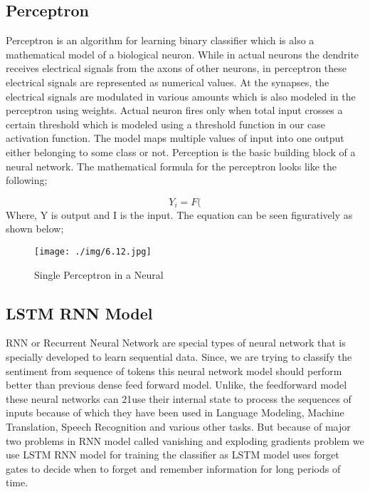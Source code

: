         \subsection{Perceptron}
Perceptron is an algorithm for learning binary classifier which is also a mathematical
model of a biological neuron. While in actual neurons the dendrite receives electrical
signals from the axons of other neurons, in perceptron these electrical signals are
represented as numerical values. At the synapses, the electrical signals are modulated
in various amounts which is also modeled in the perceptron using weights. Actual
neuron fires only when total input crosses a certain threshold which is modeled using a
threshold function in our case activation function. The model maps multiple values of
input into one output either belonging to some class or not. Perception is the basic
building block of a neural network. The mathematical formula for the perceptron looks
like the following;

    $$ Y_i = F($$
Where, Y is output and I is the input.
The equation can be seen figuratively as shown below;

        \begin{figure}[hbt!]
            \centering
                \texttt{[image: ./img/6.12.jpg]}
                \caption{Single Perceptron in a Neural }
        \end{figure}
        \subsection{LSTM RNN Model}
RNN or Recurrent Neural Network are special types of neural network that is specially
developed to learn sequential data. Since, we are trying to classify the sentiment from
sequence of tokens this neural network model should perform better than previous
dense feed forward model. Unlike, the feedforward model these neural networks can
21use their internal state to process the sequences of inputs because of which they have
been used in Language Modeling, Machine Translation, Speech Recognition and
various other tasks. But because of major two problems in RNN model called vanishing
and exploding gradients problem we use LSTM RNN model for training the classifier
as LSTM model uses forget gates to decide when to forget and remember information
for long periods of time.
